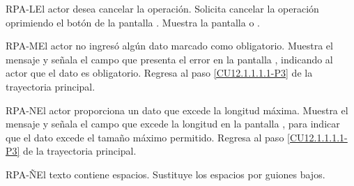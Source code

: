 	\begin{UCtrayectoriaA}{RPA-L}{El actor desea cancelar la operación.}
		\UCpaso[\UCactor] Solicita cancelar la operación oprimiendo el botón  de la pantalla .
		\UCpaso[\UCsist] Muestra la pantalla  o .
	\end{UCtrayectoriaA}

	\begin{UCtrayectoriaA}{RPA-M}{El actor no ingresó algún dato marcado como obligatorio.}
		\UCpaso[\UCsist] Muestra el mensaje  y señala el campo que presenta el error en la pantalla , indicando al actor que el dato es obligatorio.
		\UCpaso Regresa al paso \ref{CU12.1.1.1.1-P3} de la trayectoria principal.
	\end{UCtrayectoriaA}

	\begin{UCtrayectoriaA}{RPA-N}{El actor proporciona un dato que excede la longitud máxima.}
		\UCpaso[\UCsist] Muestra el mensaje  y señala el campo que excede la longitud en la pantalla , para indicar que el dato excede el tamaño máximo permitido.
		\UCpaso Regresa al paso \ref{CU12.1.1.1.1-P3} de la trayectoria principal.
	\end{UCtrayectoriaA}

	\begin{UCtrayectoriaA}{RPA-Ñ}{El texto contiene espacios.}
		\UCpaso[\UCsist] Sustituye los espacios por guiones bajos.
	\end{UCtrayectoriaA}